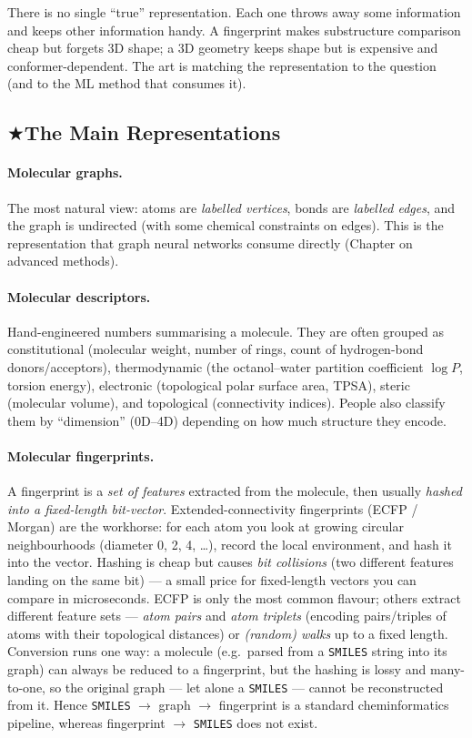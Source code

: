 \documentclass[11pt, oneside]{book}
\makeatletter
\newcommand{\starglyph}{\textcolor{stargold}{\ensuremath{\bigstar}}}
\newcommand{\starsec}[1]{%
  \texorpdfstring{\starglyph\hspace{0.4em}\textcolor{star@frame}{#1}}{#1}}
\makeatother
\begin{document}
\begin{intbox}
There is no single ``true'' representation. Each one throws away some information
and keeps other information handy. A fingerprint makes substructure comparison
cheap but forgets 3D shape; a 3D geometry keeps shape but is expensive and
conformer-dependent. The art is matching the representation to the question (and
to the ML method that consumes it).
\end{intbox}

\subsection{\starsec{The Main Representations}}

\paragraph{Molecular graphs.} The most natural view: atoms are
\emph{labelled vertices}, bonds are \emph{labelled edges}, and the graph is
undirected (with some chemical constraints on edges). This is the representation
that graph neural networks consume directly (Chapter on advanced methods).

\paragraph{Molecular descriptors.} Hand-engineered numbers summarising a
molecule. They are often grouped as constitutional (molecular weight, number of
rings, count of hydrogen-bond donors/acceptors), thermodynamic (the
octanol--water partition coefficient $\log P$, torsion energy), electronic
(topological polar surface area, TPSA), steric (molecular volume), and
topological (connectivity indices). People also classify them by ``dimension''
(0D--4D) depending on how much structure they encode.

\paragraph{Molecular fingerprints.} A fingerprint is a \emph{set of features}
extracted from the molecule, then usually \emph{hashed into a fixed-length
bit-vector}. Extended-connectivity fingerprints (ECFP / Morgan) are the workhorse:
for each atom you look at growing circular neighbourhoods (diameter 0, 2, 4,
\dots), record the local environment, and hash it into the vector. Hashing is
cheap but causes \emph{bit collisions} (two different features landing on the same
bit) --- a small price for fixed-length vectors you can compare in microseconds.
ECFP is only the most common flavour; others extract different feature sets ---
\emph{atom pairs} and \emph{atom triplets} (encoding pairs/triples of atoms with
their topological distances) or \emph{(random) walks} up to a fixed length.
Conversion runs one way: a molecule (e.g.\ parsed from a \texttt{SMILES} string
into its graph) can always be reduced to a fingerprint, but the hashing is lossy
and many-to-one, so the original graph --- let alone a \texttt{SMILES} --- cannot
be reconstructed from it. Hence \texttt{SMILES} $\to$ graph $\to$ fingerprint is a
standard cheminformatics pipeline, whereas fingerprint $\to$ \texttt{SMILES} does
not exist.
\end{document}
